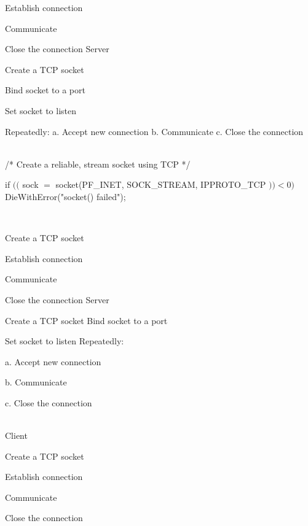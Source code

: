 \begin{description}
\begin{enumerate}
  \ite Establish connection

  \ite Communicate

  \ite Close the connection Server

\end{enumerate}

Create a TCP socket

Bind socket to a port

Set socket to listen

Repeatedly:
a. Accept new connection
b. Communicate
c. Close the connection


\os{\newpage}\item[{\rot\bf  TCP Client/Server Interaction }]~\\[-3ex]

/* Create a reliable, stream socket using TCP */

if $(($ sock $=$ socket(PF\_INET, SOCK\_STREAM, IPPROTO\_TCP $))<0)$ DieWithError("socket() failed");


\os{\newpage}\item[{\rot\bf  Client }]~\\[-3ex]

\begin{enumerate}
  \ite Create a TCP socket

  \ite Establish connection

  \ite Communicate

  \ite Close the connection Server

\end{enumerate}

Create a TCP socket Bind socket to a port

Set socket to listen Repeatedly:

a. Accept new connection

b. Communicate

c. Close the connection


\item[{\rot\bf  TCP Client/Server Interaction  }]~\\[-3ex]

Client

\begin{enumerate}
  \ite Create a TCP socket

  \ite Establish connection

  \ite Communicate

  \ite Close the connection

\end{enumerate}



\end{description}
